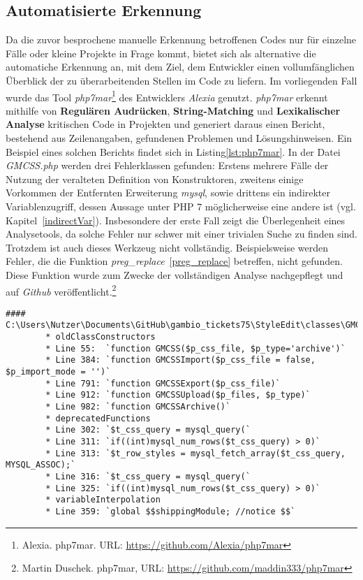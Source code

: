    \subsection{Automatisierte Erkennung}
        Da die zuvor besprochene manuelle Erkennung betroffenen Codes nur für einzelne Fälle oder kleine Projekte in Frage kommt, bietet sich als alternative die 
        automatiche Erkennung an, mit dem Ziel, dem Entwickler einen vollumfänglichen Überblick der zu überarbeitenden Stellen im Code zu liefern. Im vorliegenden Fall
        wurde das Tool \textit{\ac{php7mar}}\footnote{Alexia. php7mar. URL: \url{https://github.com/Alexia/php7mar}} des Entwicklers \textit{Alexia} genutzt.
        \textit{\ac{php7mar}} erkennt mithilfe von \textbf{Regulären Audrücken}, \textbf{String-Matching} und \textbf{Lexikalischer Analyse} kritischen Code in 
        Projekten und generiert daraus einen Bericht, bestehend aus Zeilenangaben, gefundenen Problemen und Lösungshinweisen. Ein Beispiel eines solchen Berichts findet
        sich in Listing\ref{lst:php7mar}. In der Datei \textit{GMCSS.php} werden drei Fehlerklassen gefunden: Erstens mehrere Fälle der Nutzung der veralteten Definition von
        Konstruktoren, zweitens einige Vorkommen der Entfernten Erweiterung \textit{mysql}, sowie drittens ein indirekter Variablenzugriff, dessen Aussage unter PHP 7
        möglicherweise eine andere ist (vgl. Kapitel~\ref{indirectVar}). Insbesondere der erste Fall zeigt die Überlegenheit eines Analysetools, da solche Fehler nur
        schwer mit einer trivialen Suche zu finden sind. Trotzdem ist auch dieses Werkzeug nicht vollständig. Beispielsweise werden Fehler, die die Funktion 
        \textit{preg\_replace}~\ref{preg_replace} betreffen, nicht gefunden. Diese Funktion wurde zum Zwecke der vollständigen Analyse nachgepflegt und auf 
        \textit{Github} veröffentlicht.\footnote{Martin Duschek. php7mar, URL: \url{https://github.com/maddin333/php7mar}}

        \begin{lstlisting}[caption={Beispiel eines generierten Berichts mit \textit{\ac{php7mar}}}, label={lst:php7mar}]
        #### C:\Users\Nutzer\Documents\GitHub\gambio_tickets75\StyleEdit\classes\GMCSS.php
        * oldClassConstructors
        * Line 55:  `function GMCSS($p_css_file, $p_type='archive')`
        * Line 384: `function GMCSSImport($p_css_file = false, $p_import_mode = '')`
        * Line 791: `function GMCSSExport($p_css_file)`
        * Line 912: `function GMCSSUpload($p_files, $p_type)`
        * Line 982: `function GMCSSArchive()`
        * deprecatedFunctions
        * Line 302: `$t_css_query = mysql_query(`
        * Line 311: `if((int)mysql_num_rows($t_css_query) > 0)`
        * Line 313: `$t_row_styles = mysql_fetch_array($t_css_query, MYSQL_ASSOC);`
        * Line 316: `$t_css_query = mysql_query(`
        * Line 325: `if((int)mysql_num_rows($t_css_query) > 0)`
        * variableInterpolation
        * Line 359: `global $$shippingModule; //notice $$`
        \end{lstlisting}

